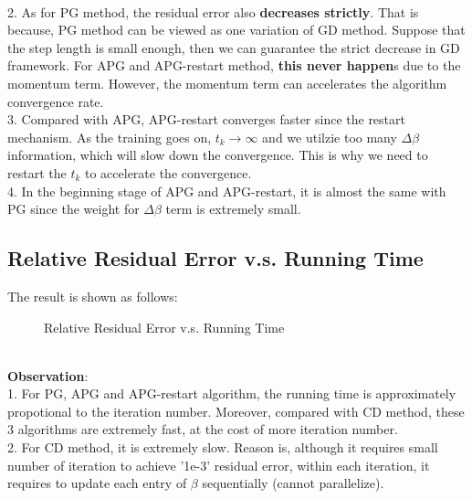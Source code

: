 \documentclass{article}
\begin{document}
\\
2. As for PG method, the residual error also \textbf{decreases strictly}. That is because, PG method can be viewed as one variation of GD method. Suppose that the step length is small enough, then we can guarantee the strict decrease in GD framework. For APG and APG-restart method, \textbf{this never happen}s due to the momentum term. However, the momentum term can accelerates the algorithm convergence rate.
\\
3. Compared with APG, APG-restart converges faster since the restart mechanism. As the training goes on, $t_k \rightarrow \infty$ and we utilzie too many $\Delta \beta$ information, which will slow down the convergence. This is why we need to restart the $t_k$ to accelerate the convergence.
\\
4. In the beginning stage of APG and APG-restart, it is almost the same with PG since the weight for $\Delta \beta$ term is extremely small.
\subsection{Relative Residual Error v.s. Running Time}
The result is shown as follows:
	\begin{figure}[h]
	\centering
	\caption{Relative Residual Error v.s. Running Time}
	\label{fig:002} %
\end{figure}
\\
\textbf{Observation}:
\vspace{4pt}
\\
1. For PG, APG and APG-restart algorithm, the running time is approximately propotional to the iteration number. Moreover, compared with CD method, these 3 algorithms are extremely fast, at the cost of more iteration number.
\\
2. For CD method, it is extremely slow. Reason is, although it requires small number of iteration to achieve '1e-3' residual error, within each iteration, it requires to update each entry of $\beta$ sequentially (cannot parallelize).
\end{document}
